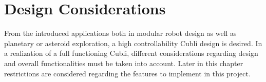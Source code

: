 \chapter{Design Considerations}\label{chap:designConsiderations}

From the introduced applications both in modular robot design as well as planetary or asteroid exploration, a high controllability Cubli design is desired.
In a realization of a full functioning Cubli, different considerations regarding design and overall functionalities must be taken into account. Later in this chapter restrictions are considered regarding the features to implement in this project.





